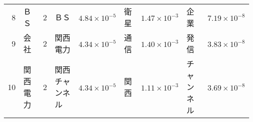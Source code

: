 \begin{table}[htbp]
\begin{center}
\begin{tabular}{|r|ll|ll|ll|ll|}
  8	  & ＢＳ     & \hspace{-2mm}2\hspace{-1.0mm} & ＢＳ           & \hspace{-2mm}$4.84\times 10^{-5}$\hspace{-1.5mm} & 衛星       & \hspace{-2mm}$1.47\times 10^{-3}$\hspace{-1.5mm} & 企業       & \hspace{-2mm}$7.19\times 10^{-8}$\hspace{-1.5mm} \\
  9	  & 会社     & \hspace{-2mm}2\hspace{-1.0mm} & 関西電力       & \hspace{-2mm}$4.34\times 10^{-5}$\hspace{-1.5mm} & 通信       & \hspace{-2mm}$1.40\times 10^{-3}$\hspace{-1.5mm} & 発信       & \hspace{-2mm}$3.83\times 10^{-8}$\hspace{-1.5mm} \\
  10	  & 関西電力 & \hspace{-2mm}2\hspace{-1.0mm} & 関西チャンネル & \hspace{-2mm}$4.34\times 10^{-5}$\hspace{-1.5mm} & 関西       & \hspace{-2mm}$1.11\times 10^{-3}$\hspace{-1.5mm} & チャンネル & \hspace{-2mm}$3.69\times 10^{-8}$\hspace{-1.5mm} \\
  \hline
\end{tabular}
\end{center}
\end{table}
